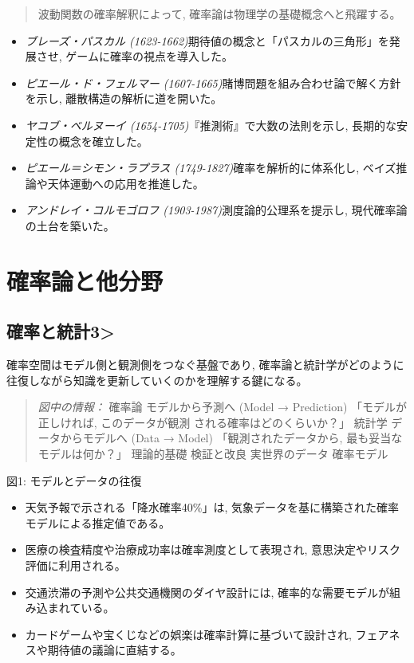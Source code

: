 \documentclass[uplatex,dvipdfmx,11pt,a4paper,openany]{bxjsbook}
\newenvironment{noteblock}{\begin{quote}\color{black!72}\small}{\end{quote}}
\newenvironment{figuretext}{\begin{quote}\small\color{black!65}\emph{図中の情報：}}{\end{quote}}
\begin{document}
\begin{noteblock}
波動関数の確率解釈によって, 確率論は物理学の基礎概念へと飛躍する。
\end{noteblock}

\begin{itemize}
\item \emph{ブレーズ・パスカル (1623-1662)}期待値の概念と「パスカルの三角形」を発展させ, ゲームに確率の視点を導入した。
\item \emph{ピエール・ド・フェルマー (1607-1665)}賭博問題を組み合わせ論で解く方針を示し, 離散構造の解析に道を開いた。
\item \emph{ヤコブ・ベルヌーイ (1654-1705)}『推測術』で大数の法則を示し, 長期的な安定性の概念を確立した。
\item \emph{ピエール＝シモン・ラプラス (1749-1827)}確率を解析的に体系化し, ベイズ推論や天体運動への応用を推進した。
\item \emph{アンドレイ・コルモゴロフ (1903-1987)}測度論的公理系を提示し, 現代確率論の土台を築いた。
\end{itemize}

\section{確率論と他分野}
\subsection{確率と統計3>}
確率空間はモデル側と観測側をつなぐ基盤であり, 確率論と統計学がどのように往復しながら知識を更新していくのかを理解する鍵になる。

\begin{figuretext}
確率論 \quad モデルから予測へ \quad (Model → Prediction) \quad 「モデルが正しければ, このデータが観測 \quad される確率はどのくらいか？」 \quad 統計学 \quad データからモデルへ \quad (Data → Model) \quad 「観測されたデータから, \quad 最も妥当なモデルは何か？」 \quad 理論的基礎 \quad 検証と改良 \quad 実世界のデータ \quad 確率モデル
\end{figuretext}

図1: モデルとデータの往復

\begin{itemize}
\item 天気予報で示される「降水確率40\%」は, 気象データを基に構築された確率モデルによる推定値である。
\item 医療の検査精度や治療成功率は確率測度として表現され, 意思決定やリスク評価に利用される。
\item 交通渋滞の予測や公共交通機関のダイヤ設計には, 確率的な需要モデルが組み込まれている。
\item カードゲームや宝くじなどの娯楽は確率計算に基づいて設計され, フェアネスや期待値の議論に直結する。
\end{itemize}
\end{document}
